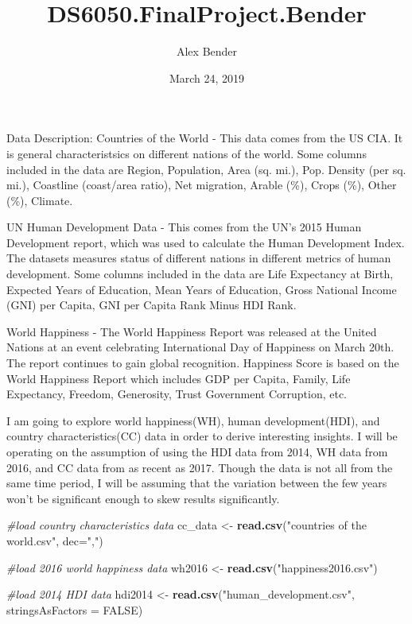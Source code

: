 \documentclass[]{article}
\title{DS6050.FinalProject.Bender}
\author{Alex Bender}
\date{March 24, 2019}
\newenvironment{Shaded}{\begin{snugshade}}{\end{snugshade}}
\newcommand{\CommentTok}[1]{\textcolor[rgb]{0.56,0.35,0.01}{\textit{#1}}}
\newcommand{\DataTypeTok}[1]{\textcolor[rgb]{0.13,0.29,0.53}{#1}}
\newcommand{\KeywordTok}[1]{\textcolor[rgb]{0.13,0.29,0.53}{\textbf{#1}}}
\newcommand{\NormalTok}[1]{#1}
\newcommand{\OtherTok}[1]{\textcolor[rgb]{0.56,0.35,0.01}{#1}}
\newcommand{\StringTok}[1]{\textcolor[rgb]{0.31,0.60,0.02}{#1}}
\begin{document}
\maketitle

Data Description: Countries of the World - This data comes from the US
CIA. It is general characteristsics on different nations of the world.
Some columns included in the data are Region, Population, Area (sq.
mi.), Pop. Density (per sq. mi.), Coastline (coast/area ratio), Net
migration, Arable (\%), Crops (\%), Other (\%), Climate.

UN Human Development Data - This comes from the UN's 2015 Human
Development report, which was used to calculate the Human Development
Index. The datasets measures status of different nations in different
metrics of human development. Some columns included in the data are Life
Expectancy at Birth, Expected Years of Education, Mean Years of
Education, Gross National Income (GNI) per Capita, GNI per Capita Rank
Minus HDI Rank.

World Happiness - The World Happiness Report was released at the United
Nations at an event celebrating International Day of Happiness on March
20th. The report continues to gain global recognition. Happiness Score
is based on the World Happiness Report which includes GDP per Capita,
Family, Life Expectancy, Freedom, Generosity, Trust Government
Corruption, etc.

I am going to explore world happiness(WH), human development(HDI), and
country characteristics(CC) data in order to derive interesting
insights. I will be operating on the assumption of using the HDI data
from 2014, WH data from 2016, and CC data from as recent as 2017. Though
the data is not all from the same time period, I will be assuming that
the variation between the few years won't be significant enough to skew
results significantly.

\begin{Shaded}
\begin{Highlighting}[]
\CommentTok{#load country characteristics data}
\NormalTok{cc_data <-}\StringTok{ }\KeywordTok{read.csv}\NormalTok{(}\StringTok{"countries of the world.csv"}\NormalTok{, }\DataTypeTok{dec=}\StringTok{","}\NormalTok{)}

\CommentTok{#load 2016 world happiness data}
\NormalTok{wh2016 <-}\StringTok{ }\KeywordTok{read.csv}\NormalTok{(}\StringTok{"happiness2016.csv"}\NormalTok{)}

\CommentTok{#load 2014 HDI data}
\NormalTok{hdi2014 <-}\StringTok{ }\KeywordTok{read.csv}\NormalTok{(}\StringTok{"human_development.csv"}\NormalTok{, }\DataTypeTok{stringsAsFactors =} \OtherTok{FALSE}\NormalTok{)}
\end{Highlighting}
\end{Shaded}
\end{document}
